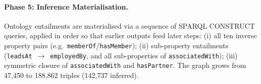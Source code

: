 \begin{sloppypar}\paragraph{Phase 5: Inference Materialisation.}
\label{sec:construction:inference}
Ontology entailments are materialised via a sequence of SPARQL CONSTRUCT queries, applied in order so that earlier outputs feed later steps: (i) all ten inverse property pairs (e.g.\ \texttt{memberOf}/\texttt{hasMember}); (ii) sub-property entailments (\texttt{leadsAt}~$\to$~\texttt{employedBy}, and all sub-properties of \texttt{associatedWith}); (iii) symmetric closure of \texttt{associatedWith} and \texttt{hasPartner}.
The graph grows from 47,450 to 188,862 triples (142,737 inferred).\end{sloppypar}